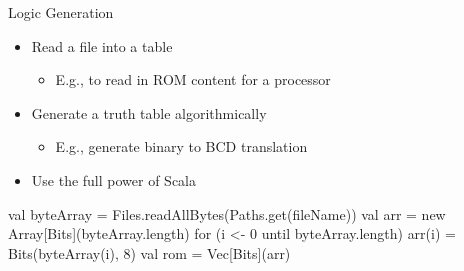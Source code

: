 \documentclass[xcolor=pdflatex,dvipsnames,table]{beamer}
\begin{document}
\begin{frame}[fragile]{Logic Generation}
\begin{itemize}
\item Read a file into a table
\begin{itemize}
\item E.g., to read in ROM content for a processor
\end{itemize}
\item Generate a truth table algorithmically
\begin{itemize}
\item E.g., generate binary to BCD translation
\end{itemize}
\item Use the full power of Scala
\end{itemize}
\begin{chisel}
val byteArray = Files.readAllBytes(Paths.get(fileName))
val arr = new Array[Bits](byteArray.length)
for (i <- 0 until byteArray.length) {
  arr(i) = Bits(byteArray(i), 8)
}
val rom = Vec[Bits](arr)
\end{chisel}
\end{frame}
%
\end{document}
